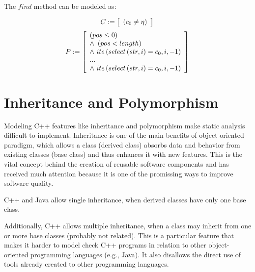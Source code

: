 \documentclass[a4paper]{llncs}
\begin{document}
The $find$ method can be modeled as:

\begin{equation}
\label{cfind-string}
C := \left [ \begin{array}{ll}
                \left(c_{0} \neq \eta\right)\\
              \end{array} \right ]  \\
\end{equation}
%
\begin{equation}
\label{pfind-string}
P := \left [ \begin{array}{ll}
	       \left(pos \leq 0\right)\\
               \wedge \, \, \left(pos < length\right)\\
               \wedge \, \, ite\left(select\left(str, i\right) = c_{0}, i, -1\right)\\
	       ...\\
	       \wedge \, \, ite\left(select\left(str, i\right) = c_{0}, i, -1\right)\\
              \end{array} \right ]  \\
\end{equation}

\section{Inheritance and Polymorphism}

Modeling C++ features like inheritance and polymorphism
make static analysis difficult to implement.
Inheritance is one of the main benefits of object-oriented paradigm,
which allows a class (derived class) absorbs data and behavior
from existing classes (base class) and thus enhances it with new features.
This is the vital concept behind the creation of reusable software components
and has received much attention because it is one of the promissing ways to
improve software quality.

C++ and Java allow single inheritance, when derived classes have only one base class.

Additionally, C++ allows multiple inheritance, when a class may inherit from
one or more base classes (probably not related). This is a particular feature
that makes it harder to model check C++ programs in relation to other
object-oriented programming languages (e.g., Java). It also disallows
the direct use of tools already created to other programming languages.
\end{document}
